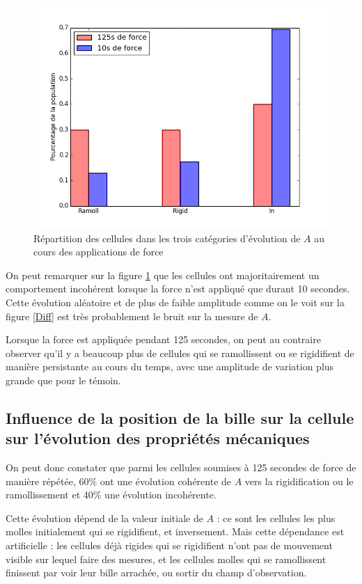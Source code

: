\begin{figure}
\includegraphics[scale=0.5]{Figures/FRI_temoin_vs_C4.png} 
\caption{Répartition des cellules dans les trois catégories d'évolution de $A$ au cours des applications de force \label{FRI_temoin}}
\end{figure}

On peut remarquer sur la figure \ref{FRI_temoin} que les cellules ont majoritairement un comportement incohérent lorsque la force n'est appliqué que durant 10 secondes.
Cette évolution aléatoire et de plus de faible amplitude comme on le voit sur la figure \ref{Diff} est très probablement le bruit sur la mesure de $A$. 

Lorsque la force est appliquée pendant 125 secondes, on peut au contraire observer qu'il y a beaucoup plus de cellules qui se ramollissent ou se rigidifient de manière persistante au cours du temps, avec une amplitude de variation plus grande que pour le témoin. 

\subsection{Influence de la position de la bille sur la cellule sur l'évolution des propriétés mécaniques}

On peut donc constater que parmi les cellules soumises à 125 secondes de force de manière répétée, 60\% ont une évolution cohérente de $A$ vers la rigidification ou le ramollissement et 40\% une évolution incohérente. 

Cette évolution dépend de la valeur initiale de $A$ : ce sont les cellules les plus molles initialement qui se rigidifient, et inversement. Mais cette dépendance est artificielle : les cellules déjà rigides qui se rigidifient n'ont pas de mouvement visible sur lequel faire des mesures, et les cellules molles qui se ramollissent finissent par voir leur bille arrachée, ou sortir du champ d'observation. 

